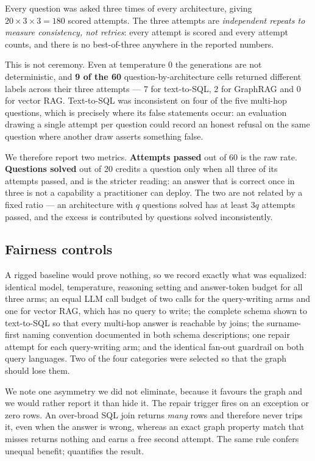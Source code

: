 Every question was asked three times of every architecture, giving
$20 \times 3 \times 3 = 180$ scored attempts. The three attempts are
\emph{independent repeats to measure consistency, not retries}: every attempt is
scored and every attempt counts, and there is no best-of-three anywhere in the
reported numbers.

This is not ceremony. Even at temperature 0 the generations are not
deterministic, and \textbf{9 of the 60}
question-by-architecture cells returned different labels across their three
attempts --- 7 for text-to-SQL, 2 for GraphRAG and
0 for vector RAG. Text-to-SQL was inconsistent on four of the five
multi-hop questions, which is precisely where its false statements occur: an
evaluation drawing a single attempt per question could record an honest refusal
on the same question where another draw asserts something false.

We therefore report two metrics. \textbf{Attempts passed} out of 60 is the raw
rate. \textbf{Questions solved} out of 20 credits a question only when all three
of its attempts passed, and is the stricter reading: an answer that is correct
once in three is not a capability a practitioner can deploy. The two are not
related by a fixed ratio --- an architecture with $q$ questions solved has at
least $3q$ attempts passed, and the excess is contributed by questions solved
inconsistently.

\subsection{Fairness controls}

A rigged baseline would prove nothing, so we record exactly what was equalized:
identical model, temperature, reasoning setting and answer-token budget for all
three arms; an equal LLM call budget of two calls for the query-writing arms and
one for vector RAG, which has no query to write; the complete schema shown to
text-to-SQL so that every multi-hop answer is reachable by joins; the
surname-first naming convention documented in both schema descriptions; one
repair attempt for each query-writing arm; and the identical fan-out guardrail on
both query languages. Two of the four categories were selected so that the graph
should lose them.

We note one asymmetry we did not eliminate, because it favours the graph and we
would rather report it than hide it. The repair trigger fires on an exception or
zero rows. An over-broad SQL join returns \emph{many} rows and therefore never
trips it, even when the answer is wrong, whereas an exact graph property match
that misses returns nothing and earns a free second attempt. The same rule confers
unequal benefit;  quantifies the result.
